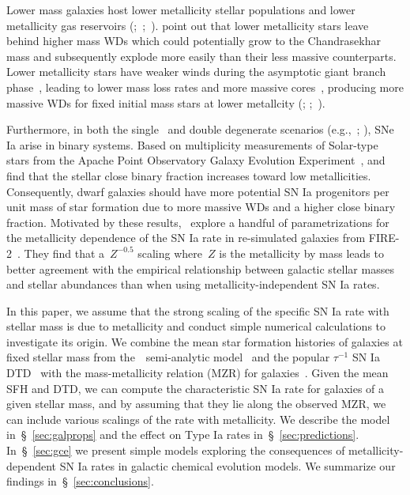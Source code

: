 \documentclass[ms.tex]{subfiles}
\begin{document}
Lower mass galaxies host lower metallicity stellar populations
\citep{Gallazzi2005, Kirby2013} and lower metallicity gas reservoirs
(\citealp{Tremonti2004};~\citealp*{Zahid2011};~\citealp{Andrews2013,
Zahid2014}).
\citet{Kistler2013} point out that lower metallicity stars leave behind higher
mass WDs which could potentially grow to the Chandrasekhar mass and
subsequently explode more easily than their less massive counterparts.
Lower metallicity stars have weaker winds during the asymptotic giant branch
phase~\citep{Willson2000, Marigo2007}, leading to lower mass loss rates and
more massive cores~\citep{Kalirai2014}, producing more massive WDs for fixed
initial mass stars at lower metallcity (\citealp{Umeda1999};
\citealp*{Meng2008};~\citealp{Zhao2012}).
\par
Furthermore, in both the single~\citep[e.g.,][]{Whelan1973} and double
degenerate scenarios (e.g.,~\mbox{\citealp{Iben1984}};
\mbox{\citealp{Webbink1984}}), SNe Ia arise in binary systems.
Based on multiplicity measurements of Solar-type stars from the Apache Point
Observatory Galaxy Evolution Experiment~\citep[APOGEE;][]{Majewski2017},
\citet{Badenes2018} and~\citet*{Moe2019} find that the stellar close binary
fraction increases toward low metallicities.
Consequently, dwarf galaxies should have more potential SN Ia progenitors per
unit mass of star formation due to more massive WDs and a higher close binary
fraction.
Motivated by these results,~\citet{Gandhi2022} explore a handful of
parametrizations for the metallicity dependence of the SN Ia rate in
re-simulated galaxies from FIRE-2~\citep{Hopkins2018}.
They find that a~$Z^{-0.5}$ scaling where~$Z$ is the metallicity by mass leads
to better agreement with the empirical relationship between galactic stellar
masses and stellar abundances than when using metallicity-independent SN Ia
rates.
\par
In this paper, we assume that the strong scaling of the specific SN Ia rate
with stellar mass is due to metallicity and conduct simple numerical
calculations to investigate its origin.
We combine the mean star formation histories of galaxies at fixed stellar
mass from the~\um~semi-analytic model~\citep{Behroozi2019} and the popular
$\tau^{-1}$ SN Ia DTD~\citep[e.g.,][]{Maoz2012a} with the mass-metallicity
relation (MZR) for galaxies~\citep{Tremonti2004, Andrews2013, Zahid2011,
Zahid2014}.
Given the mean SFH and DTD, we can compute the characteristic SN Ia rate for
galaxies of a given stellar mass, and by assuming that they lie along the
observed MZR, we can include various scalings of the rate with metallicity.
We describe the model in~\S~\ref{sec:galprops} and the effect on Type Ia rates
in~\S~\ref{sec:predictions}.
In~\S~\ref{sec:gce} we present simple models exploring the consequences of
metallicity-dependent SN Ia rates in galactic chemical evolution models.
We summarize our findings in~\S~\ref{sec:conclusions}.
\end{document}
